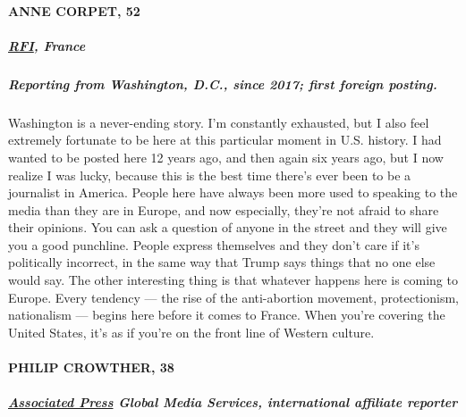 \hypertarget{anne-corpet-52}{%
\paragraph{ANNE CORPET, 52}\label{anne-corpet-52}}

\hypertarget{rfi-france}{%
\subparagraph{\texorpdfstring{\textbf{\href{http://www.rfi.fr/fr/tag/anne-corpet/}{RFI},
France}}{RFI, France}}\label{rfi-france}}

\hypertarget{reporting-from-washington-dc-since-2017-first-foreign-posting-1}{%
\subparagraph{\texorpdfstring{\textbf{Reporting from Washington, D.C.,
since 2017; first foreign
posting.}}{Reporting from Washington, D.C., since 2017; first foreign posting.}}\label{reporting-from-washington-dc-since-2017-first-foreign-posting-1}}

Washington is a never-ending story. I'm constantly exhausted, but I also
feel extremely fortunate to be here at this particular moment in U.S.
history. I had wanted to be posted here 12 years ago, and then again six
years ago, but I now realize I was lucky, because this is the best time
there's ever been to be a journalist in America. People here have always
been more used to speaking to the media than they are in Europe, and now
especially, they're not afraid to share their opinions. You can ask a
question of anyone in the street and they will give you a good
punchline. People express themselves and they don't care if it's
politically incorrect, in the same way that Trump says things that no
one else would say. The other interesting thing is that whatever happens
here is coming to Europe. Every tendency --- the rise of the
anti-abortion movement, protectionism, nationalism --- begins here
before it comes to France. When you're covering the United States, it's
as if you're on the front line of Western culture.

\hypertarget{philip-crowther-38}{%
\paragraph{PHILIP CROWTHER, 38}\label{philip-crowther-38}}

\hypertarget{associated-press-global-media-services-international-affiliate-reporter}{%
\subparagraph{\texorpdfstring{\textbf{\href{https://www.ap.org/en-us/}{Associated
Press}} \textbf{Global Media Services, international affiliate
reporter}}{Associated Press Global Media Services, international affiliate reporter}}\label{associated-press-global-media-services-international-affiliate-reporter}}

